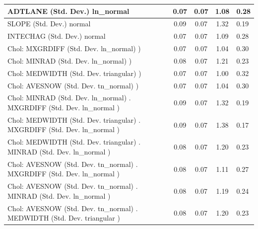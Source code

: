 \begin{table}
\begin{center}
\begin{tabular}{|l|l|c|c|c|l|}
			\hline
			ADTLANE (Std. Dev.) ln_normal &  & 0.07 & 0.07 & 1.08 & 0.28 \\
			\hline
			SLOPE (Std. Dev.) normal &  & 0.09 & 0.07 & 1.32 & 0.19 \\
			\hline
			INTECHAG (Std. Dev.) normal &  & 0.07 & 0.07 & 1.09 & 0.28 \\
			\hline
			 Chol: MXGRDIFF (Std. Dev. ln_normal) ) &  & 0.07 & 0.07 & 1.04 & 0.30 \\
			\hline
			 Chol: MINRAD (Std. Dev. ln_normal) ) &  & 0.08 & 0.07 & 1.21 & 0.23 \\
			\hline
			 Chol: MEDWIDTH (Std. Dev. triangular) ) &  & 0.07 & 0.07 & 1.00 & 0.32 \\
			\hline
			 Chol: AVESNOW (Std. Dev. tn_normal) ) &  & 0.07 & 0.07 & 1.04 & 0.30 \\
			\hline
			 Chol: MINRAD (Std. Dev. ln_normal) . MXGRDIFF (Std. Dev.   ln_normal ) &  & 0.09 & 0.07 & 1.32 & 0.19 \\
			\hline
			 Chol: MEDWIDTH (Std. Dev. triangular) . MXGRDIFF (Std. Dev.   ln_normal ) &  & 0.09 & 0.07 & 1.38 & 0.17 \\
			\hline
			 Chol: MEDWIDTH (Std. Dev. triangular) . MINRAD (Std. Dev.   ln_normal ) &  & 0.08 & 0.07 & 1.20 & 0.23 \\
			\hline
			 Chol: AVESNOW (Std. Dev. tn_normal) . MXGRDIFF (Std. Dev.   ln_normal ) &  & 0.08 & 0.07 & 1.11 & 0.27 \\
			\hline
			 Chol: AVESNOW (Std. Dev. tn_normal) . MINRAD (Std. Dev.   ln_normal ) &  & 0.08 & 0.07 & 1.19 & 0.24 \\
			\hline
			 Chol: AVESNOW (Std. Dev. tn_normal) . MEDWIDTH (Std. Dev.   triangular ) &  & 0.08 & 0.07 & 1.20 & 0.23 \\
			\hline
		\end{tabular}
	\end{center}
\end{table}